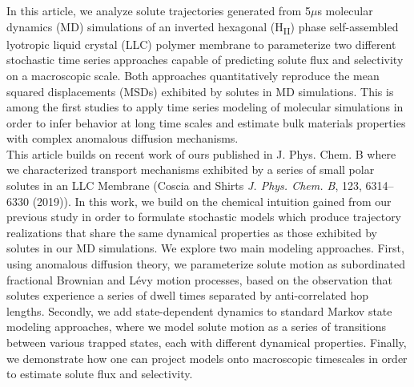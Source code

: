 \documentclass[fontsize=11pt]{article}
\begin{document}
	In this article, we analyze solute trajectories generated from
        5$\mu$s molecular dynamics (MD) simulations of an inverted
        hexagonal (H\textsubscript{II}) phase self-assembled lyotropic
        liquid crystal (LLC) polymer membrane to parameterize two
        different stochastic time series approaches capable of
        predicting solute flux and selectivity on a macroscopic
        scale. Both approaches quantitatively reproduce the mean
        squared displacements (MSDs) exhibited by solutes in MD
        simulations. This is among the first studies to apply time
        series modeling of molecular simulations in order to infer
        behavior at long time scales and estimate bulk
        materials properties with complex anomalous diffusion
        mechanisms.\\

	This article builds on recent work of ours published in
        J. Phys. Chem. B where we characterized transport mechanisms
        exhibited by a series of small polar solutes in an LLC
        Membrane (Coscia and Shirts \textit{J. Phys.  Chem. B}, 123,
        6314--6330 (2019)). In this work, we build on the chemical
        intuition gained from our previous study in order to formulate
        stochastic models which produce trajectory realizations that
        share the same dynamical properties as those exhibited by
        solutes in our MD simulations. We explore two main modeling
        approaches. First, using anomalous diffusion theory, we
        parameterize solute motion as subordinated fractional Brownian
        and L\'evy motion processes, based on the observation that
        solutes experience a series of dwell times separated by
        anti-correlated hop lengths. Secondly, we add state-dependent
        dynamics to standard Markov state modeling approaches, where
        we model solute motion as a series of transitions between
        various trapped states, each with different dynamical
        properties.  Finally, we demonstrate how one can project models 
        onto macroscopic timescales in order to estimate
        solute flux and selectivity.\\
	
\end{document}
